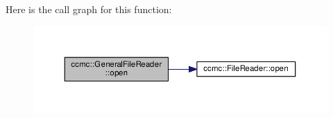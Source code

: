 Here is the call graph for this function\-:
\nopagebreak
\begin{figure}[H]
\begin{center}
\leavevmode
\includegraphics[width=350pt]{classccmc_1_1_general_file_reader_a4996a8e305a2e1f9f25228d127bb55bf_cgraph}
\end{center}
\end{figure}




